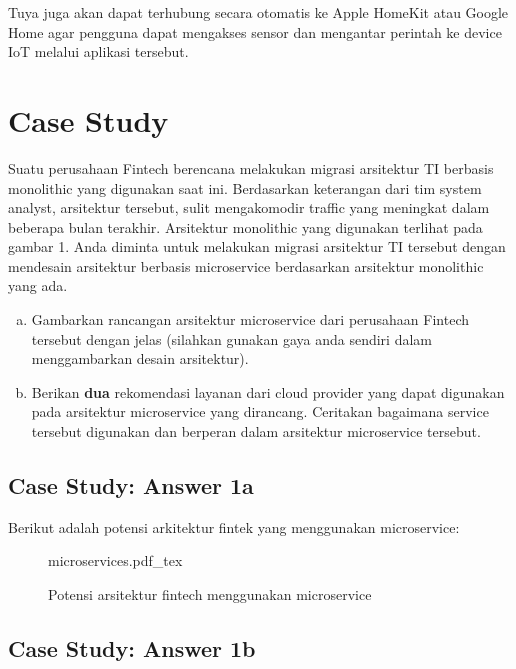 \documentclass[
	11pt, %
	indonesian
]{assignment}
\newcommand{\incfig}[1]{%
    \def\svgwidth{\columnwidth}
    {#1.pdf_tex}
}
\begin{document}
Tuya juga akan dapat terhubung secara otomatis ke Apple HomeKit atau Google Home agar pengguna dapat mengakses sensor dan mengantar perintah ke device IoT melalui aplikasi tersebut.

\newpage

\section*{Case Study}

\begin{problem}
Suatu perusahaan Fintech berencana melakukan migrasi arsitektur TI berbasis monolithic yang digunakan saat ini. Berdasarkan keterangan dari tim system analyst, arsitektur tersebut, sulit mengakomodir traffic yang meningkat dalam beberapa bulan terakhir. Arsitektur monolithic yang digunakan terlihat pada gambar 1. Anda diminta untuk melakukan migrasi arsitektur TI tersebut dengan mendesain arsitektur berbasis microservice berdasarkan arsitektur monolithic yang ada.

\begin{enumerate}[a.]
	\item Gambarkan rancangan arsitektur microservice dari perusahaan Fintech tersebut dengan jelas (silahkan gunakan gaya anda sendiri dalam menggambarkan desain arsitektur).
	\item Berikan \textbf{dua} rekomendasi layanan dari cloud provider yang dapat digunakan pada arsitektur microservice yang dirancang. Ceritakan bagaimana service tersebut digunakan dan berperan dalam arsitektur microservice tersebut.
\end{enumerate}
\end{problem}

\subsection*{Case Study: Answer 1a}

Berikut adalah potensi arkitektur fintek yang menggunakan microservice:

\begin{figure}[ht]
	\tiny
	\centering
	\incfig{microservices}
	\caption{Potensi arsitektur fintech menggunakan microservice}
\end{figure}

\pagebreak

\subsection*{Case Study: Answer 1b}
\end{document}
